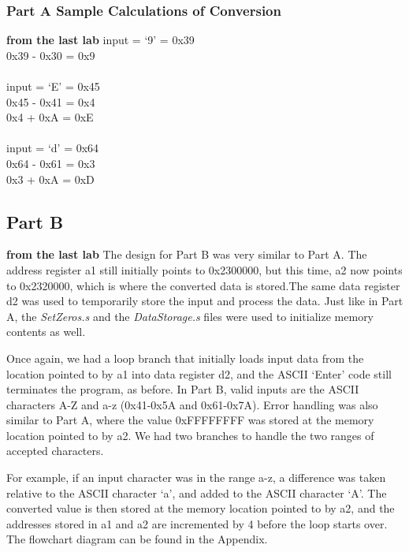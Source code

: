 \documentclass[letterpaper]{article}
\begin{document}

    \subsubsection{Part A Sample Calculations of Conversion}
        \textbf{from the last lab}
        input = `9' = 0x39\\
        0x39 - 0x30 = 0x9\\
        \\
        input = `E' = 0x45\\
        0x45 - 0x41 = 0x4\\
        0x4 + 0xA = 0xE\\
        \\
        input = `d' = 0x64\\
        0x64 - 0x61 = 0x3\\
        0x3 + 0xA = 0xD



  \subsection{Part B}
  \textbf{from the last lab}
    The design for Part B was very similar to Part A. The address register a1 still
    initially points to 0x2300000, but this time, a2 now points to 0x2320000, which is
    where the converted data is stored.The same data register d2 was used to temporarily
    store the input and process the data. Just like in Part A, the \textit{SetZeros.s} and the \textit{DataStorage.s} files
    were used to initialize memory contents as well.

    Once again, we had a loop branch that initially loads input data from the location
    pointed to by a1 into data register d2, and the ASCII `Enter' code still terminates
    the program, as before. In Part B, valid inputs are the ASCII characters A-Z and a-z
    (0x41-0x5A and 0x61-0x7A).
    Error handling was also similar to Part A, where the value 0xFFFFFFFF was stored at the
    memory location pointed to by a2. We had two branches to handle the two ranges of accepted
    characters.

    For example, if an input character was in the range a-z, a difference was taken
    relative to the ASCII character `a', and added to the ASCII character `A'. The
    converted value is then stored at the memory location pointed to by a2, and
    the addresses stored in a1 and a2 are incremented by 4 before the loop
    starts over. The flowchart diagram can be found in the Appendix.
\end{document}
